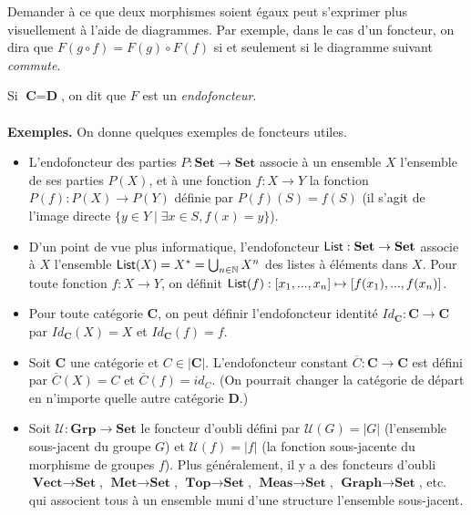 \documentclass[11pt,a4paper]{article}
\newcommand{\gr}{\textbf}
\newcommand{\il}{\textit}
\newcommand{\N}{\mathbb{N}}
\newcommand{\U}{\mathcal{U}}
\newcommand{\info}[1]{\text{{\fontfamily{lmss}\selectfont #1}}}
\newcommand{\1}{\mathbbm{1}}
\begin{document}
Demander à ce que deux morphismes soient égaux peut s'exprimer plus visuellement à l'aide de diagrammes. Par exemple, dans le cas d'un foncteur, on dira que $F(g \circ f) = F(g) \circ F(f)$ si et seulement si le diagramme suivant \il{commute}.
\begin{center}
\end{center}
Si $\gr{C} = \gr{D}$, on dit que $F$ est un \il{endofoncteur}.\\\\
\gr{Exemples.} On donne quelques exemples de foncteurs utiles.\begin{itemize}
\setlength\itemsep{-0.3em}
\item L'endofoncteur des parties $P : \gr{Set} \to \gr{Set}$ associe à un ensemble $X$ l'ensemble de ses parties $P(X)$, et à une fonction $f : X \to Y$ la fonction $P(f) : P(X) \to P(Y)$ définie par $P(f)(S) = f(S)$ (il s'agit de l'image directe $\{ y \in Y \mid \exists x \in S, f(x) = y \}$).
\item D'un point de vue plus informatique, l'endofoncteur $\info{List} : \gr{Set} \to \gr{Set}$ associe à $X$ l'ensemble $\info{List}(X) = X^* = \bigcup_{n\in \N} X^n$ des listes à éléments dans $X$. Pour toute fonction $f : X \to Y$, on définit $\info{List}(f) : [x_1,...,x_n] \mapsto [f(x_1),...,f(x_n)]$.
\item Pour toute catégorie $\gr{C}$, on peut définir l'endofoncteur identité $Id_\gr{C} : \gr{C} \to \gr{C}$ par $Id_\gr{C}(X) = X$ et $Id_\gr{C}(f) = f$.
\item Soit $\gr{C}$ une catégorie et $C \in |\gr{C}|$. L'endofoncteur constant $\overline{C} : \gr{C} \to \gr{C}$ est défini par $\overline{C}(X) = C$ et $\overline{C}(f) = id_C$. (On pourrait changer la catégorie de départ en n'importe quelle autre catégorie $\gr{D}$.)
\item Soit $\U : \gr{Grp} \to \gr{Set}$ le foncteur d'oubli défini par $\U(G) = |G|$ (l'ensemble sous-jacent du groupe $G$) et $\U(f) = |f|$ (la fonction sous-jacente du morphisme de groupes $f$). Plus généralement, il y a des foncteurs d'oubli $\gr{Vect} \to \gr{Set}$, $\gr{Met} \to \gr{Set}$, $\gr{Top} \to \gr{Set}$, $\gr{Meas} \to \gr{Set}$, $\gr{Graph} \to \gr{Set}$, etc. qui associent tous à un ensemble muni d'une structure l'ensemble sous-jacent.
\end{itemize}
\end{document}
